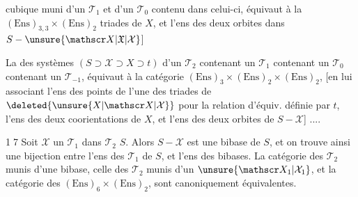 cubique  muni d'un $\mathscr T_1$ et d'un $\mathscr T_0$ contenu dans celui-ci, équivaut à la    $(\mathrm{Ens})_{3,3}\times(\mathrm{Ens})_2$   \inserted{[en associant l'ens des} triades de $X$, et l'ens des deux orbites dans $S-\unsure{\mathscr X|\mathfrak X|\mathcal X}$]

 La   des systèmes $(S\supset\mathscr X\supset X\supset t)$ d'un $\mathscr T_2$ contenant un $\mathscr T_1$ contenant un $\mathscr T_0$ contenant un $\mathscr T_{-1}$, équivaut à la catégorie $(\mathrm{Ens})_3\times(\mathrm{Ens})_2\times(\mathrm{Ens})_2$, [en lui associant l'ens des points de l'une des triades de $\deleted{\unsure{X|\mathscr X|\mathcal X}}$ pour la relation d'équiv. définie par $t$, l'ens des deux coorientations de $X$, et l'ens des deux orbites de $S-\mathscr X$] ....

\textcircled{17} Soit $\mathscr X$ un $\mathscr T_1$ dans  $\mathscr T_2$ $S$. Alors $S-\mathscr X$ est une bibase de $S$, et on trouve ainsi une bijection entre l'ens des $\mathscr T_1$ de $S$, et l'ens des bibases.
La catégorie des $\mathscr T_2$ munis d'une bibase, celle des $\mathscr T_2$ munis d'un $\unsure{\mathscr X_1|\mathcal X_1}$, et la catégorie des $(\mathrm{Ens})_6\times(\mathrm{Ens})_2$, sont canoniquement équivalentes.


